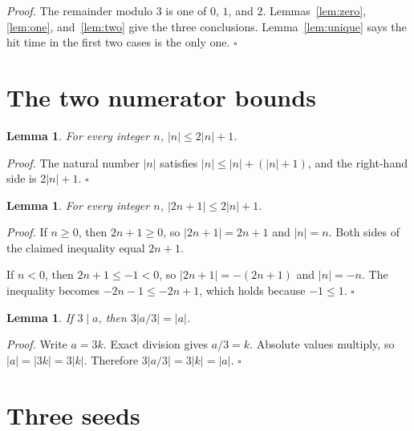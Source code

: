 \documentclass[11pt,letterpaper]{article}
\newtheorem{lemma}[theorem]{Lemma}
\newenvironment{proof}{\noindent\textit{Proof.}}{\hfill\(\square\)}
\begin{document}
\begin{proof}
The remainder modulo \(3\) is one of \(0\), \(1\), and \(2\). Lemmas~\ref{lem:zero}, \ref{lem:one}, and~\ref{lem:two} give the three conclusions. Lemma~\ref{lem:unique} says the hit time in the first two cases is the only one.
\end{proof}

\section{The two numerator bounds}

\begin{lemma}
\label{lem:num0}
For every integer \(n\), \(\lvert n\rvert\le 2\lvert n\rvert+1\).
\end{lemma}

\begin{proof}
The natural number \(\lvert n\rvert\) satisfies \(\lvert n\rvert\le \lvert n\rvert+(\lvert n\rvert+1)\), and the right-hand side is \(2\lvert n\rvert+1\).
\end{proof}

\begin{lemma}
\label{lem:num1}
For every integer \(n\), \(\lvert 2n+1\rvert\le 2\lvert n\rvert+1\).
\end{lemma}

\begin{proof}
If \(n\ge 0\), then \(2n+1\ge 0\), so \(\lvert 2n+1\rvert=2n+1\) and \(\lvert n\rvert=n\). Both sides of the claimed inequality equal \(2n+1\).

If \(n<0\), then \(2n+1\le -1<0\), so \(\lvert 2n+1\rvert=-(2n+1)\) and \(\lvert n\rvert=-n\). The inequality becomes \(-2n-1\le -2n+1\), which holds because \(-1\le 1\).
\end{proof}

\begin{lemma}
\label{lem:cancel}
If \(3\mid a\), then \(3\lvert a/3\rvert=\lvert a\rvert\).
\end{lemma}

\begin{proof}
Write \(a=3k\). Exact division gives \(a/3=k\). Absolute values multiply, so \(\lvert a\rvert=\lvert 3k\rvert=3\lvert k\rvert\). Therefore \(3\lvert a/3\rvert=3\lvert k\rvert=\lvert a\rvert\).
\end{proof}

\section{Three seeds}
\end{document}
